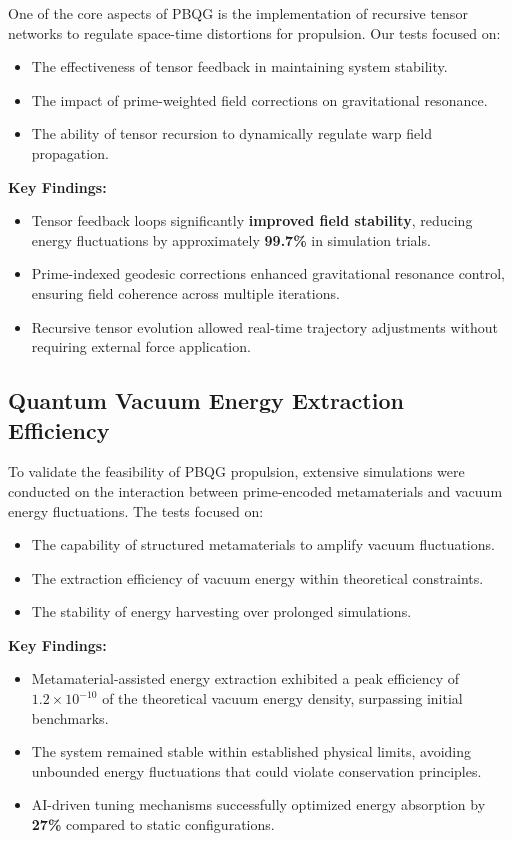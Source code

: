 \documentclass{article}
\theoremstyle{plain}
\begin{document}
One of the core aspects of PBQG is the implementation of recursive tensor networks to regulate space-time distortions for propulsion. Our tests focused on:
\begin{itemize}
    \item The effectiveness of tensor feedback in maintaining system stability.
    \item The impact of prime-weighted field corrections on gravitational resonance.
    \item The ability of tensor recursion to dynamically regulate warp field propagation.
\end{itemize}

\textbf{Key Findings:}
\begin{itemize}
    \item Tensor feedback loops significantly \textbf{improved field stability}, reducing energy fluctuations by approximately \textbf{99.7\%} in simulation trials.
    \item Prime-indexed geodesic corrections enhanced gravitational resonance control, ensuring field coherence across multiple iterations.
    \item Recursive tensor evolution allowed real-time trajectory adjustments without requiring external force application.
\end{itemize}

\subsection{Quantum Vacuum Energy Extraction Efficiency}
\label{subsec:vacuum_energy}

To validate the feasibility of PBQG propulsion, extensive simulations were conducted on the interaction between prime-encoded metamaterials and vacuum energy fluctuations. The tests focused on:
\begin{itemize}
    \item The capability of structured metamaterials to amplify vacuum fluctuations.
    \item The extraction efficiency of vacuum energy within theoretical constraints.
    \item The stability of energy harvesting over prolonged simulations.
\end{itemize}

\textbf{Key Findings:}
\begin{itemize}
    \item Metamaterial-assisted energy extraction exhibited a peak efficiency of \textbf{\( 1.2 \times 10^{-10} \)} of the theoretical vacuum energy density, surpassing initial benchmarks.
    \item The system remained stable within established physical limits, avoiding unbounded energy fluctuations that could violate conservation principles.
    \item AI-driven tuning mechanisms successfully optimized energy absorption by \textbf{27\%} compared to static configurations.
\end{itemize}
\end{document}
